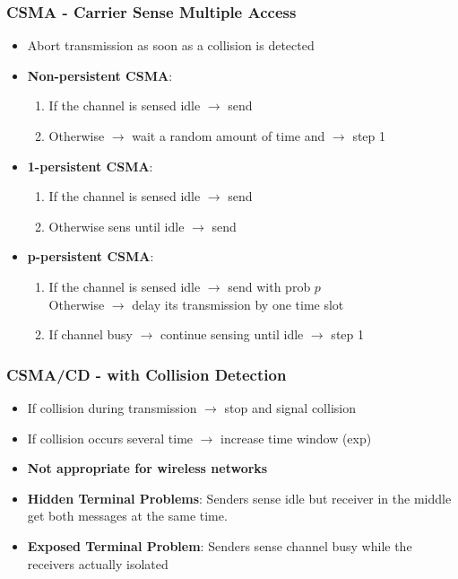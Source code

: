\subsubsection{CSMA - Carrier Sense Multiple Access}
\begin{itemize}
	\item Abort transmission as soon as a collision is detected
	\item \textbf{Non-persistent CSMA}:
	\begin{enumerate}
		\item If the channel is sensed idle $\rightarrow$ send
    	\item Otherwise $\rightarrow$ wait a random amount of time and  $\rightarrow$ step 1
	\end{enumerate}
	\item \textbf{1-persistent CSMA}:
	\begin{enumerate}
		\item If the channel is sensed idle $\rightarrow$ send
    	\item Otherwise sens until idle $\rightarrow$ send
	\end{enumerate}
	\item \textbf{p-persistent CSMA}:
	\begin{enumerate}
		\item If the channel is sensed idle $\rightarrow$ send with prob $p$
		\\ Otherwise  $\rightarrow$ delay its transmission by one time slot
		\item If channel busy  $\rightarrow$ continue sensing until idle $\rightarrow$ step 1
	\end{enumerate}

\end{itemize}
\subsubsection{CSMA/CD - with Collision Detection}
\begin{itemize}
	\item If collision during transmission $\rightarrow$ stop and signal collision
	\item If collision occurs several time $\rightarrow$ increase time window (exp)
	\item \textbf{Not appropriate for wireless networks}
	\item \textbf{Hidden Terminal Problems}: Senders sense idle  but receiver in the middle get both messages at the same time.
	\item \textbf{Exposed Terminal Problem}: Senders sense channel busy while the receivers actually isolated
\end{itemize}
